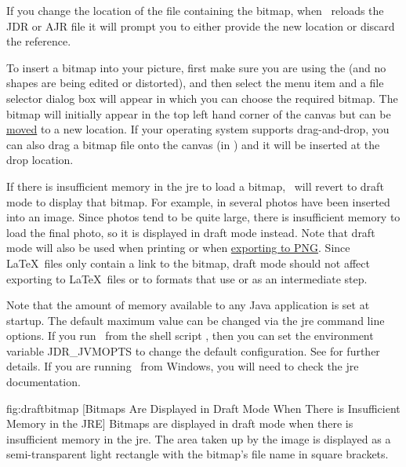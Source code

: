 \begin{important}
If you change the location of the file containing the bitmap, when
\FlowframTk\ reloads the \gls*{JDR} or \gls*{AJR} file it will
prompt you to either provide the new location or discard the reference.
\end{important}


To insert a \gls{bitmap} into your picture, first make sure you are using
the  (and no shapes are
being edited or distorted), and then select the menu item
 and a file selector dialog box will appear in which
you can choose the required \gls{bitmap}. The \gls{bitmap} will initially appear
in the top left hand corner of the \gls{canvas} but can be
\hyperref[sec:moveobjects]{moved} to a new location.  If your
operating system supports \gls{drag-and-drop}, you can also drag a
\gls{bitmap} file onto the \gls{canvas} (in \selectmode) and it will
be inserted at the drop location.

If there is insufficient memory in the \gls{jre} to load a bitmap,
\FlowframTk\ will revert to draft mode to display that bitmap.  For
example, in  several photos have been
inserted into an image. Since photos tend to be quite large, there
is insufficient memory to load the final photo, so it is displayed
in draft mode instead. Note that draft mode will also be used when
printing or when \hyperref[sec:exportpng]{exporting to PNG}. Since \LaTeX\ files
only contain a link to the bitmap, draft mode should not affect
exporting to \LaTeX\ files or to formats that use  or
 as an intermediate step.

Note that the amount of memory available to any Java application is
set at startup. The default maximum value can be changed via the
\gls{jre} command line options.  If you run \FlowframTk\ from the
shell script , then you can set the environment
variable \gls{JDR_JVMOPTS} to change the default configuration. See
 for further details. If you are running
\FlowframTk\ from Windows, you will need to check the \gls*{jre}
documentation.

\FloatFig
  {fig:draftbitmap}
  {}
  [Bitmaps Are Displayed in Draft Mode When There is Insufficient Memory in the JRE]
  {Bitmaps are displayed in draft mode
when there is insufficient memory in the \gls{jre}. The area taken up by
the image is displayed as a semi-transparent light  rectangle
with the bitmap's file name in square brackets.}

